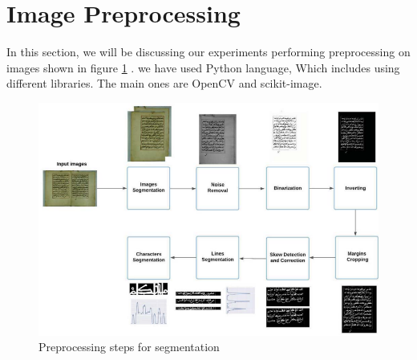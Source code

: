 \newpage

\section{Image Preprocessing}
In this section, we will be discussing our experiments performing preprocessing on images shown in figure \ref{fig:preprocessing} . we have used Python language, Which includes using different libraries. The main ones are OpenCV and scikit-image.

\begin{figure}[!htb]
    \centering
    \includegraphics[width=14cm]{images/preprocessing.png}
    \caption{Preprocessing steps for segmentation}
    \label{fig:preprocessing}
\end{figure}

